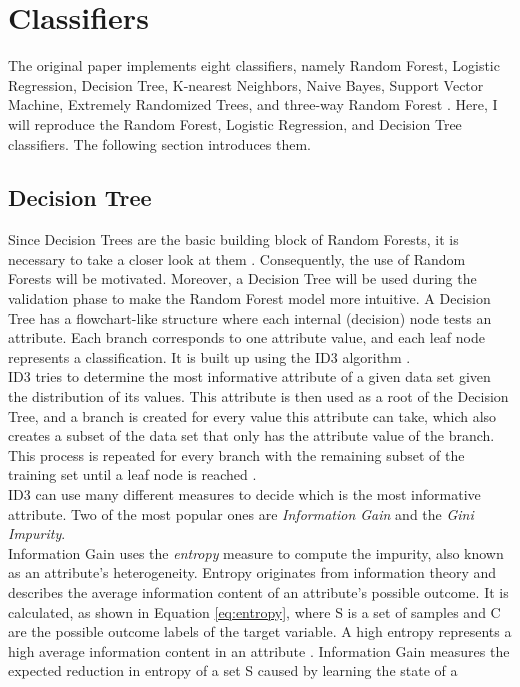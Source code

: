 \section{Classifiers}
The original paper implements eight classifiers, namely Random 
Forest, Logistic Regression, Decision Tree, K-nearest Neighbors, Naive Bayes, 
Support Vector Machine, Extremely Randomized Trees, and three-way Random 
Forest \cite{RN127}. 
Here, I will reproduce the Random Forest, Logistic Regression, and Decision 
Tree classifiers. The following section introduces them.
\subsection{Decision Tree}
Since Decision Trees are the basic building block of Random Forests, it 
is necessary to take a closer look at them \cite{RN163}. Consequently, the use 
of Random Forests will be motivated. Moreover, a Decision Tree will be used 
during the validation phase to make the Random Forest model more intuitive.
A Decision Tree has a flowchart-like structure where each internal (decision) 
node tests an attribute. Each branch corresponds to one attribute value, and 
each leaf node represents a classification. It is built up using the ID3 
algorithm \cite{RN171}.
\\
ID3 tries to determine the most informative attribute of a given data set given 
the distribution of its values. This attribute is then used as a root of the 
Decision Tree, and a branch is created for every value this attribute can take, 
which also creates a subset of the data set that only has the attribute value 
of the branch. This process is repeated for every branch with the remaining 
subset of the training set until a leaf node is reached \cite{RN165}.
\\
ID3 can use many different measures to decide which is the most informative 
attribute. Two of the most popular ones are \textit{Information Gain} and the 
\textit{Gini Impurity}.
\\
Information Gain uses the \textit{entropy} measure to compute the impurity, 
also known as an attribute's heterogeneity. Entropy originates from information 
theory and describes the average information content of an attribute's possible 
outcome. It is calculated, as shown in Equation \ref{eq:entropy}, where S is a 
set of samples and C are the possible outcome labels of the target variable. A 
high entropy represents a high average 
information content in an attribute \cite{RN167}. Information Gain measures the 
expected reduction in entropy of a set S caused by learning the state of a 
